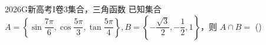 
\begin{problem}{2026}{G}{新高考I卷}{3}{集合，三角函数}
已知集合 $ A=\left\{\sin\dfrac{7\pi}{6},\cos\dfrac{5\pi}{3},\tan\dfrac{5\pi}{4}\right\},B=\left\{-\dfrac{\sqrt{3}}{2},-\dfrac{1}{2},1\right\} $，则 $ A\cap B= $ (\hspace{1cm})
\begin{choices}
\end{choices}
\end{problem}

\begin{answer}
\end{answer}

\begin{solutions}
\end{solutions}